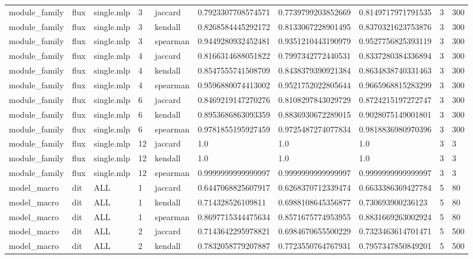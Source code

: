 \begin{tabular}{llllllllll}
module\_family & flux & single.mlp & 3 & jaccard & 0.7923307708574571 & 0.7739799203852669 & 0.8149717971791535 & 3 & 300 \\
module\_family & flux & single.mlp & 3 & kendall & 0.8268584445292172 & 0.8133067228901495 & 0.8370321623753876 & 3 & 300 \\
module\_family & flux & single.mlp & 3 & spearman & 0.9449280932452481 & 0.9351210443190979 & 0.9527756825393119 & 3 & 300 \\
module\_family & flux & single.mlp & 4 & jaccard & 0.8166314688051822 & 0.7997342772440531 & 0.8337280384336894 & 3 & 300 \\
module\_family & flux & single.mlp & 4 & kendall & 0.8547555741508709 & 0.8438379390921384 & 0.8634838740331463 & 3 & 300 \\
module\_family & flux & single.mlp & 4 & spearman & 0.9596880074413002 & 0.9521752022805644 & 0.9665968815283299 & 3 & 300 \\
module\_family & flux & single.mlp & 6 & jaccard & 0.8469219147270276 & 0.8108297843029729 & 0.8724215197272747 & 3 & 300 \\
module\_family & flux & single.mlp & 6 & kendall & 0.8953686863093359 & 0.8836930672289015 & 0.9028075149001801 & 3 & 300 \\
module\_family & flux & single.mlp & 6 & spearman & 0.9781855195927459 & 0.9725487274077834 & 0.9818836980970396 & 3 & 300 \\
module\_family & flux & single.mlp & 12 & jaccard & 1.0 & 1.0 & 1.0 & 3 & 3 \\
module\_family & flux & single.mlp & 12 & kendall & 1.0 & 1.0 & 1.0 & 3 & 3 \\
module\_family & flux & single.mlp & 12 & spearman & 0.9999999999999997 & 0.9999999999999997 & 0.9999999999999997 & 3 & 3 \\
model\_macro & dit & ALL & 1 & jaccard & 0.6447068825607917 & 0.6268370712339474 & 0.6633386369427784 & 5 & 80 \\
model\_macro & dit & ALL & 1 & kendall & 0.714328526109811 & 0.6988108645356877 & 0.730693900236123 & 5 & 80 \\
model\_macro & dit & ALL & 1 & spearman & 0.8697715344475634 & 0.8571675774953955 & 0.8831669263002924 & 5 & 80 \\
model\_macro & dit & ALL & 2 & jaccard & 0.7143642295978821 & 0.6984670655500229 & 0.7323463614701471 & 5 & 500 \\
model\_macro & dit & ALL & 2 & kendall & 0.7832058779207887 & 0.7723550764767931 & 0.7957347850849201 & 5 & 500 \\

\end{tabular}
